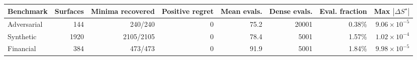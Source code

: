 \begin{tabular}{lrrrrrrr}
\toprule
Benchmark & Surfaces & Minima recovered & Positive regret & Mean evals. & Dense evals. & Eval. fraction & Max $|\Delta S^\star|$ \\
\midrule
Adversarial & 144 & 240/240 & 0 & 75.2 & 20001 & 0.38\% & $9.06\times 10^{-5}$ \\
Synthetic & 1920 & 2105/2105 & 0 & 78.4 & 5001 & 1.57\% & $1.02\times 10^{-4}$ \\
Financial & 384 & 473/473 & 0 & 91.9 & 5001 & 1.84\% & $9.98\times 10^{-5}$ \\
\bottomrule
\end{tabular}
